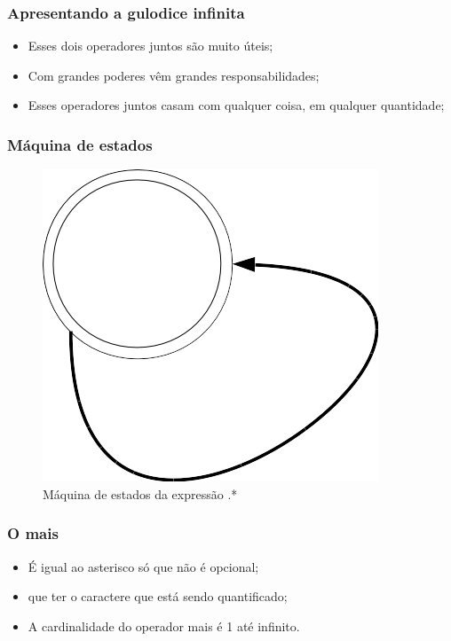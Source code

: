 
\begin{frame}
	\frametitle{Apresentando a gulodice infinita}

	\begin{itemize}
		\item Esses dois operadores juntos são muito úteis;
		\item Com grandes poderes vêm grandes responsabilidades;
		\item Esses operadores juntos casam com qualquer coisa, em qualquer quantidade;
	\end{itemize}
\end{frame}

\begin{frame}
	\frametitle{Máquina de estados}

	\begin{figure}
		\centering
		\includegraphics[height=.75\textheight]{./imagens/re/maq_estados.png}
		\caption{Máquina de estados da expressão .*}
	\end{figure}

\end{frame}


\begin{frame}
	\frametitle{O mais}
	\begin{itemize}
		\item É igual ao asterisco só que não é opcional;
		\item {} que ter o caractere que está sendo quantificado;
		\item A cardinalidade do operador mais é 1 até infinito.
	\end{itemize}
\end{frame}

